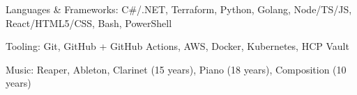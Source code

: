 \documentclass[]{awesome-cv}
\begin{document}



\vspace{-2mm}
	\cventry
	{}
	{}
	{}
	{}
	{\begin{cvitems}
		\item {Languages \& Frameworks: C\#/.NET, Terraform, Python, Golang, Node/TS/JS, React/HTML5/CSS, Bash, PowerShell}
		\item {Tooling: Git, GitHub + GitHub Actions, AWS, Docker, Kubernetes, HCP Vault}
		\item {Music: Reaper, Ableton, Clarinet (15 years), Piano (18 years), Composition (10 years)}
	\end{cvitems}}
\end{document}
